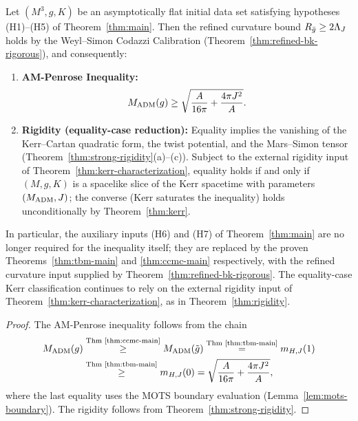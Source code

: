 \begin{theorem}\label{thm:strengthened-main}
Let $(M^3, g, K)$ be an asymptotically flat initial data set satisfying hypotheses (H1)--(H5) of Theorem~\ref{thm:main}. Then the refined curvature bound $R_{\bar{g}} \geq 2\Lambda_J$ holds by the Weyl--Simon Codazzi Calibration (Theorem~\ref{thm:refined-bk-rigorous}), and consequently:
\begin{enumerate}[label=\textup{(\arabic*)}]
    \item \textbf{AM-Penrose Inequality:}
    \begin{equation}
    M_{\mathrm{ADM}}(g) \geq \sqrt{\frac{A}{16\pi} + \frac{4\pi J^2}{A}}.
    \end{equation}
    \item \textbf{Rigidity (equality-case reduction):} Equality implies the vanishing of the Kerr--Cartan quadratic form, the twist potential, and the Mars--Simon tensor (Theorem~\ref{thm:strong-rigidity}(a)--(c)). Subject to the external rigidity input of Theorem~\ref{thm:kerr-characterization}, equality holds if and only if $(M, g, K)$ is a spacelike slice of the Kerr spacetime with parameters $(M_{\mathrm{ADM}}, J)$; the converse (Kerr saturates the inequality) holds unconditionally by Theorem~\ref{thm:kerr}.
\end{enumerate}
In particular, the auxiliary inputs (H6) and (H7) of Theorem~\ref{thm:main} are no longer required for the inequality itself; they are replaced by the proven Theorems~\ref{thm:tbm-main} and \ref{thm:ccmc-main} respectively, with the refined curvature input supplied by Theorem~\ref{thm:refined-bk-rigorous}. The equality-case Kerr classification continues to rely on the external rigidity input of Theorem~\ref{thm:kerr-characterization}, as in Theorem~\ref{thm:rigidity}.
\end{theorem}

\begin{proof}
The AM-Penrose inequality follows from the chain
\begin{equation}
\begin{aligned}
M_{\mathrm{ADM}}(g) &\stackrel{\text{Thm~\ref{thm:ccmc-main}}}{\geq} M_{\mathrm{ADM}}(\tilde{g}) \stackrel{\text{Thm~\ref{thm:tbm-main}}}{=} m_{H,J}(1) \\
&\stackrel{\text{Thm~\ref{thm:tbm-main}}}{\geq} m_{H,J}(0) = \sqrt{\frac{A}{16\pi} + \frac{4\pi J^2}{A}},
\end{aligned}
\end{equation}
where the last equality uses the MOTS boundary evaluation (Lemma~\ref{lem:mots-boundary}). The rigidity follows from Theorem~\ref{thm:strong-rigidity}.
\end{proof}

